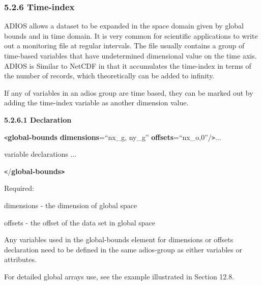 \subsubsection*{{\large \textbf{5.2.6 Time-index}}}

\vspace{10pt}
ADIOS allows a dataset to be expanded in the space domain given by global bounds 
and in time domain. It is very common for scientific applications to write out 
a monitoring file at regular intervals. The file usually contains a group of time-based 
variables that have undetermined dimensional value on the time axis. ADIOS is Similar 
to NetCDF in that it accumulates the time-index in terms of the number of records, 
which theoretically can be added to infinity.

\vspace{10pt}
If any of variables in an adios group are time based, they can be marked out by 
adding the time-index variable as another dimension value. 

\vspace{10pt}
\textbf{5.2.6.1 Declaration}

\vspace{10pt}
\texttt{<}\textbf{global-bounds} \textbf{dimensions}=``nx\_g, ny\_g'' \textbf{offsets}=``nx\_o,0''/\texttt{>}...

\vspace{10pt}
\parindent=21pt
variable declarations ...

\vspace{10pt}
\parindent=0pt
\texttt{<}/\textbf{global-bounds\texttt{>}}

\vspace{10pt}
Required:

\vspace{10pt}
\leftskip=18pt
\parindent=3pt
dimensions - the dimension of global space

\vspace{10pt}
offsets - the offset of the data set in global space

\vspace{10pt}
\leftskip=0pt
\parindent=0pt
Any variables used in the global-bounds element for dimensions or offsets declaration 
need to be defined in the same adios-group as either variables or attributes. 

\vspace{10pt}
For detailed global arrays use, see the example illustrated in Section 12.8.


